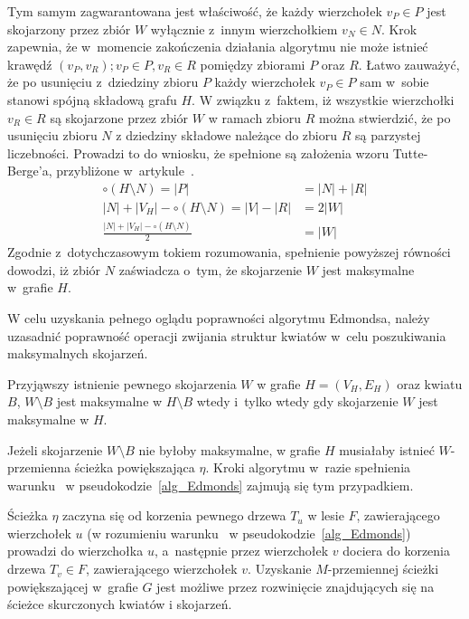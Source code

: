 {\begin{bproof}
    Tym samym zagwarantowana jest właściwość, że każdy wierzchołek $v_P \in P$ jest skojarzony przez zbiór $W$ wyłącznie z~innym wierzchołkiem $v_N \in N$.
    Krok~ zapewnia, że w~momencie zakończenia działania algorytmu nie może istnieć krawędź $(v_P, v_R); v_P \in P, v_R \in R$ pomiędzy zbiorami $P$ oraz $R$.
    Łatwo zauważyć, że po usunięciu z~dziedziny zbioru $P$ każdy wierzchołek $v_P \in P$ sam w~sobie stanowi spójną składową grafu $H$.
    W związku z~faktem, iż wszystkie wierzchołki $v_R \in R$ są skojarzone przez zbiór $W$ w ramach zbioru $R$ można stwierdzić, że po usunięciu zbioru $N$ z dziedziny składowe należące do zbioru $R$ są parzystej liczebności.
    Prowadzi to do wniosku, że spełnione są założenia wzoru Tutte-Berge'a, przybliżone w~artykule~\cite{cohen:hal-00358468}.
    \begin{align*}
        \circ(H \setminus N) = |P| &= |N| + |R|\\
        |N| + |V_H| - \circ(H \setminus N) = |V| - |R| &= 2|W|\\
        \frac{|N| + |V_H| - \circ (H \setminus N)}{2} &= |W|
    \end{align*}
    Zgodnie z~dotychczasowym tokiem rozumowania, spełnienie powyższej równości dowodzi, iż zbiór $N$ zaświadcza o~tym, że skojarzenie $W$ jest maksymalne w~grafie $H$.
  \end{bproof}
  W celu uzyskania pełnego oglądu poprawności algorytmu Edmondsa, należy uzasadnić poprawność operacji zwijania struktur kwiatów w~celu poszukiwania maksymalnych skojarzeń.
  \begin{theorem}
    Przyjąwszy istnienie pewnego skojarzenia $W$ w grafie $H=(V_H, E_H)$ oraz kwiatu $B$, $W \setminus B$ jest maksymalne w $H \setminus B$ wtedy i~tylko wtedy gdy skojarzenie $W$ jest maksymalne w $H$.
  \end{theorem}
  \begin{bproof}
    Jeżeli skojarzenie $W \setminus B$ nie byłoby maksymalne, w grafie $H$ musiałaby istnieć $W$-przemienna ścieżka powiększająca $\eta$.
    Kroki algorytmu w~razie spełnienia warunku~ w pseudokodzie~\ref{alg_Edmonds} zajmują się tym przypadkiem.

    Ścieżka $\eta$ zaczyna się od korzenia pewnego drzewa $T_u$ w lesie $F$, zawierającego wierzchołek $u$ (w rozumieniu warunku~ w pseudokodzie~\ref{alg_Edmonds}) prowadzi do wierzchołka $u$, a~następnie przez wierzchołek $v$ dociera do korzenia drzewa $T_v \in F$, zawierającego wierzchołek $v$.
    Uzyskanie $M$-przemiennej ścieżki powiększającej w~grafie $G$ jest możliwe przez rozwinięcie znajdujących się na ścieżce skurczonych kwiatów i 
    skojarzeń.


\end{bproof}}

